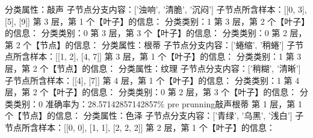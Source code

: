 \documentclass{ctexart}
\begin{document}
\begin{tcolorbox}[colframe = blue, colback = blue!10!white ,  breakable]
        分类属性：敲声\newline
        子节点分支内容：['浊响', '清脆', '沉闷']\newline
        子节点所含样本：[[0, 3], [5], [9]]\newline
第 3 层，第 1 个【叶子】的信息：\newline
        分类类别：1\newline
第 3 层，第 2 个【叶子】的信息：\newline
        分类类别：0\newline
第 3 层，第 3 个【叶子】的信息：\newline
        分类类别：0\newline
第 2 层，第 2 个【节点】的信息：\newline
        分类属性：根蒂\newline
        子节点分支内容：['蜷缩', '稍蜷']\newline
        子节点所含样本：[[1, 2], [4, 7]]\newline
第 3 层，第 1 个【叶子】的信息：\newline
        分类类别：1\newline
第 3 层，第 2 个【节点】的信息：\newline
        分类属性：纹理\newline
        子节点分支内容：['稍糊', '清晰']\newline
        子节点所含样本：[[4], [7]]\newline
第 4 层，第 1 个【叶子】的信息：\newline
        分类类别：1\newline
第 4 层，第 2 个【叶子】的信息：\newline
        分类类别：0\newline
第 2 层，第 3 个【叶子】的信息：\newline
        分类类别：0\newline
准确率为：28.57142857142857\%\newline
pre prunning\newline
['浊响', '清脆', '沉闷'] 敲声\newline
['蜷缩', '稍蜷'] 根蒂\newline
第 1 层，第 1 个【节点】的信息：\newline
        分类属性：色泽\newline
        子节点分支内容：['青绿', '乌黑', '浅白']\newline
        子节点所含样本：[[0, 0], [1, 1], [2, 2, 2]]\newline
第 2 层，第 1 个【叶子】的信息：\newline

\end{tcolorbox}
\end{document}
